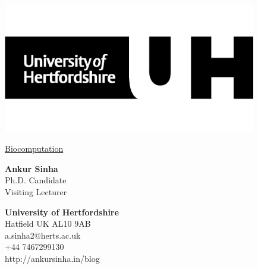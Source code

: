 \documentclass[9pt,a4paper]{memoir}
\begin{document}
\noindent
\begin{minipage}[c]{0.43\linewidth}
  \includegraphics[keepaspectratio,width=0.83\textwidth]{UH-black.png}
\end{minipage}
\begin{minipage}[c]{0.7\linewidth}
    \begin{raggedleft}
      \Huge{\selectfont \underline{Biocomputation}}
    \end{raggedleft}
\end{minipage}
\vspace{0.5cm}
\begin{Spacing}{0.9}
  \hspace*{-\parindent}%
  \begin{minipage}[c]{0.4\textwidth}
    \begin{raggedright}
    \textbf{Ankur Sinha} \\
    \small{Ph.D. Candidate} \\
    \small{Visiting Lecturer} \\
    \end{raggedright}
  \end{minipage}
  \begin{minipage}[c]{0.6\textwidth}
    \begin{raggedleft}
      \textbf{University of Hertfordshire} \\
      \small{Hatfield UK AL10 9AB} \\
      \small{a.sinha2@herts.ac.uk} \\
      \small{+44 7467299130} \\
      \small{http://ankursinha.in/blog} \\
    \end{raggedleft}
  \end{minipage}
\end{Spacing}
\end{document}
